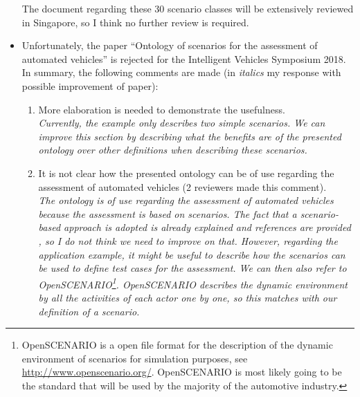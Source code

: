 \documentclass[10pt,final,a4paper,oneside,onecolumn]{article}
\begin{document}
\begin{itemize}
	The document regarding these 30 scenario classes will be extensively reviewed in Singapore, so I think no further review is required.
	
	\item Unfortunately, the paper ``Ontology of scenarios for the assessment of automated vehicles'' is rejected for the Intelligent Vehicles Symposium 2018. In summary, the following comments are made (in \textit{italics} my response with possible improvement of paper):
	\begin{enumerate}
		\item More elaboration is needed to demonstrate the usefulness.\\
		\textit{Currently, the example only describes two simple scenarios. We can improve this section by describing what the benefits are of the presented ontology over other definitions \cite{geyer2014, ulbrich2015, elrofai2016scenario} when describing these scenarios.}
		
		\item It is not clear how the presented ontology can be of use regarding the assessment of automated vehicles (2 reviewers made this comment).\\
		\textit{The ontology is of use regarding the assessment of automated vehicles because the assessment is based on scenarios. The fact that a scenario-based approach is adopted is already explained and references are provided \cite{stellet2015taxonomy, Helmer2017safety, putz2017pegasus, zofka2015datadrivetrafficscenarios, alvarez2017prospective, aparicio2013pre, lesemann2011test, geyer2014, ulbrich2015, deGelder2017assessment}, so I do not think we need to improve on that. However, regarding the application example, it might be useful to describe how the scenarios can be used to define test cases for the assessment. We can then also refer to OpenSCENARIO\footnote{OpenSCENARIO is a open file format for the description of the dynamic environment of scenarios for simulation purposes, see \url{http://www.openscenario.org/}. OpenSCENARIO is most likely going to be the standard that will be used by the majority of the automotive industry.}. OpenSCENARIO describes the dynamic environment by all the activities of each actor one by one, so this matches with our definition of a scenario.}
		

\end{enumerate}
\end{itemize}
\end{document}
